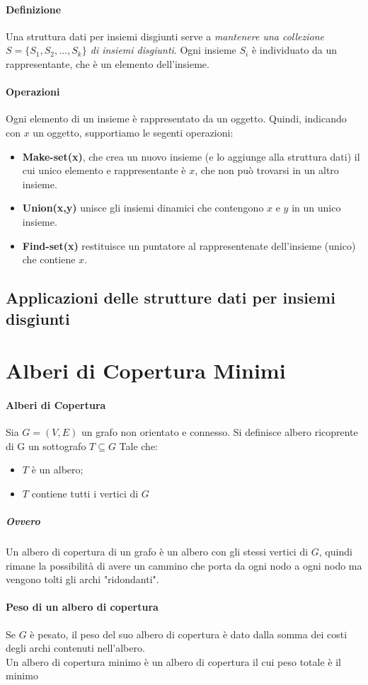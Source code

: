 	\paragraph{Definizione}
	Una struttura dati per insiemi disgiunti serve a \emph{mantenere una collezione $S = \{S_1,S_2,...,S_k\}$ di insiemi disgiunti}.
	Ogni insieme $S_i$ è individuato da un rappresentante, che è un elemento dell'insieme.

	\paragraph{Operazioni}
	Ogni elemento di un insieme è rappresentato da un oggetto.
	Quindi, indicando con $x$ un oggetto, supportiamo le segenti operazioni:
	\begin{itemize}
		\item \textbf{Make-set(x)}, che crea un nuovo insieme (e lo aggiunge alla struttura dati) il cui unico elemento e rappresentante è $x$, che non può trovarsi in un altro insieme.
		\item \textbf{Union(x,y)} unisce gli insiemi dinamici che contengono $x$ e $y$ in un unico insieme.
		\item \textbf{Find-set(x)} restituisce un puntatore al rappresentenate dell'insieme (unico) che contiene $x$.
	\end{itemize}
	\subsection*{Applicazioni delle strutture dati per insiemi disgiunti}

	\section{Alberi di Copertura Minimi}
	\paragraph*{Alberi di Copertura}
	Sia $G=(V,E)$ un grafo non orientato e connesso.
	Si definisce albero ricoprente di G un sottografo $T\subseteq G$ Tale che:
	\begin{itemize}
		\item $T$ è un albero;
		\item $T$ contiene tutti i vertici di $G$
	\end{itemize}
	\subparagraph*{Ovvero} Un albero di copertura di un grafo è un albero con gli stessi vertici di $G$, quindi rimane 
	la possibilità di avere un cammino che porta da ogni nodo a ogni nodo ma vengono tolti gli archi "ridondanti".

	\paragraph*{Peso di un albero di copertura} Se $G$ è pesato, il peso del suo albero di copertura è dato
	dalla somma dei costi degli archi contenuti nell'albero.
	\\Un albero di copertura minimo è un albero di copertura il cui peso totale è il minimo
